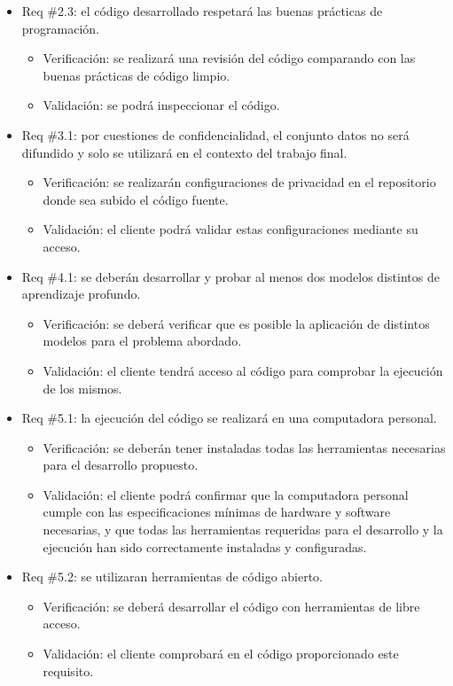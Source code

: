 \documentclass[
11pt, %
]{charter}
\begin{document}
\begin{itemize}
\item Req \#2.3: el código desarrollado respetará las buenas prácticas de programación.
\begin{itemize}
	\item Verificación: se realizará una revisión del código comparando con las buenas prácticas de código
	 limpio.
	\item Validación: se podrá inspeccionar el código.
\end{itemize}

\item Req \#3.1: por cuestiones de confidencialidad, el conjunto datos no será difundido y solo se
utilizará en el contexto del trabajo final.
\begin{itemize}
	\item Verificación: se realizarán configuraciones de privacidad en el repositorio donde sea subido el código fuente.
	\item Validación: el cliente podrá validar estas configuraciones mediante su acceso.
\end{itemize}

\item Req \#4.1: se deberán desarrollar y probar al menos dos modelos distintos de aprendizaje profundo.
\begin{itemize}
	\item Verificación: se deberá verificar que es posible la aplicación de distintos modelos para el problema abordado.
	\item Validación: el cliente tendrá acceso al código para comprobar la ejecución de los mismos.
\end{itemize}

\item Req \#5.1: la ejecución del código se realizará en una computadora personal.
\begin{itemize}
	\item Verificación: se deberán tener instaladas todas las herramientas necesarias para el desarrollo propuesto.
	\item Validación: el cliente podrá confirmar que la computadora personal cumple con las especificaciones 
    mínimas de hardware y software necesarias, y que todas las herramientas requeridas para el desarrollo y 
    la ejecución han sido correctamente instaladas y configuradas.
\end{itemize}

\item Req \#5.2: se utilizaran herramientas de código abierto.
\begin{itemize}
	\item Verificación: se deberá desarrollar el código con herramientas de libre acceso.
	\item Validación: el cliente comprobará en el código proporcionado este requisito.
\end{itemize}


\end{itemize}
\end{document}
